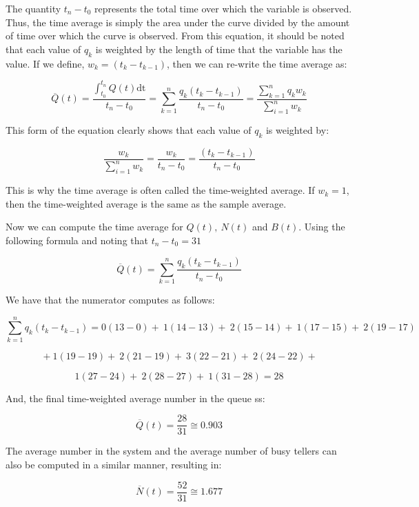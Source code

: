 \documentclass[
]{book}
\theoremstyle{definition}
\theoremstyle{definition}
\theoremstyle{definition}
\theoremstyle{definition}
\theoremstyle{remark}
\begin{document}
The quantity \(t_{n} - t_{0}\) represents the total time over which the variable is observed. Thus, the time average is simply the area under the curve divided by the amount of time
over which the curve is observed. From this equation, it should be noted
that each value of \(q_{k}\) is weighted by the length of time that the
variable has the value. If we define, \(w_{k} = (t_{k} - t_{k - 1})\),
then we can re-write the time average as:

\[\overline{Q}\left( t \right) = \frac{\int_{t_{0}}^{t_{n}}{Q\left( t \right)\text{dt}}}{t_{n} - t_{0}} = \sum_{k = 1}^{n}\frac{q_{k}(t_{k} - t_{k - 1})}{t_{n} - t_{0}} = \frac{\sum_{k = 1}^{n}{q_{k}w_{k}}}{\sum_{i = 1}^{n}w_{k}}\]

This form of the equation clearly shows that each value of \(q_{k}\) is
weighted by:

\[\frac{w_{k}}{\sum_{i = 1}^{n}w_{k}} = \frac{w_{k}}{t_{n} - t_{0}} = \frac{(t_{k} - t_{k - 1})}{t_{n} - t_{0}}\]

This is why the time average is often called the time-weighted average.
If \(w_{k} = 1\), then the time-weighted average is the same as the sample
average.

Now we can compute the time average for
\(Q\left( t \right),\ N\left( t \right)\) and \(B(t)\). Using the following
formula and noting that \(t_{n} - t_{0} = 31\)

\[\overline{Q}\left( t \right) = \sum_{k = 1}^{n}\frac{q_{k}(t_{k} - t_{k - 1})}{t_{n} - t_{0}}\]

We have that the numerator computes as follows:

\[\sum_{k = 1}^{n}{q_{k}\left( t_{k} - t_{k - 1} \right)} = 0\left( 13 - 0 \right) + \ 1\left( 14 - 13 \right) + \ 2\left( 15 - 14 \right) + \ 1\left( 17 - 15 \right) + \ 2\left( 19 - 17 \right)\]

\[\  + 1\left( 19 - 19 \right) + \ 2\left( 21 - 19 \right) + \ 3\left( 22 - 21 \right) + \ 2\left( 24 - 22 \right) + \ \]

\[1\left( 27 - 24 \right) + \ 2\left( 28 - 27 \right) + \ 1\left( 31 - 28 \right) = 28\]

And, the final time-weighted average number in the queue ss:

\[\overline{Q}\left( t \right) = \frac{28}{31} \cong 0.903\]

The average number in the system and the average number of busy tellers
can also be computed in a similar manner, resulting in:

\[\overline{N}\left( t \right) = \frac{52}{31} \cong 1.677\]
\end{document}
